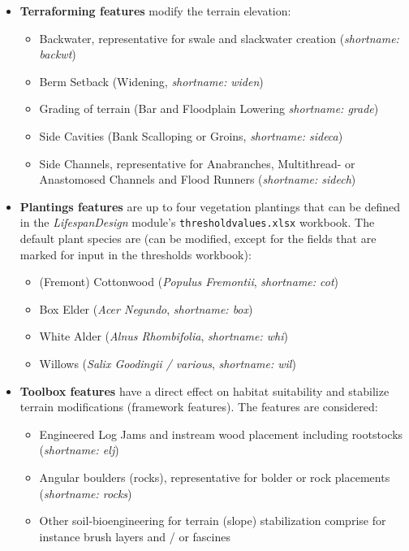 \begin{itemize}
	\item \textbf{Terraforming features} modify the terrain elevation:
	\begin{itemize}
		\item Backwater, representative for swale and slackwater creation (\textit{shortname: backwt})
		\item Berm Setback (Widening, \textit{shortname: widen})
		\item Grading of terrain (Bar and Floodplain Lowering \textit{shortname: grade})
		\item Side Cavities (Bank Scalloping or Groins, \textit{shortname: sideca})
		\item Side Channels, representative for Anabranches, Multithread- or Anastomosed Channels and Flood Runners (\textit{shortname: sidech})
	\end{itemize}
	\item \textbf{Plantings features} are up to four vegetation plantings that can be defined in the \textit{LifespanDesign} module's \texttt{threshold{\myUnderscore}values.xlsx} workbook. The default plant species are (can be modified, except for the fields that are marked for input in the thresholds workbook):
	\begin{itemize}
		\item (Fremont) Cottonwood (\textit{Populus Fremontii}, \textit{shortname: cot})
		\item Box Elder (\textit{Acer Negundo}, \textit{shortname: box})
		\item White Alder (\textit{Alnus Rhombifolia}, \textit{shortname: whi})
		\item Willows (\textit{Salix Goodingii / various}, \textit{shortname: wil})
	\end{itemize}
	\item \textbf{Toolbox features} have a direct effect on habitat suitability and stabilize terrain modifications (framework features). The features are considered:
	\begin{itemize}
		\item Engineered Log Jams and instream wood placement including rootstocks (\textit{shortname: elj})
		\item Angular boulders (rocks), representative for bolder or rock placements (\textit{shortname: rocks})
		\item Other soil-bioengineering for terrain (slope) stabilization comprise for instance brush layers and / or fascines
	\end{itemize}

\end{itemize}

